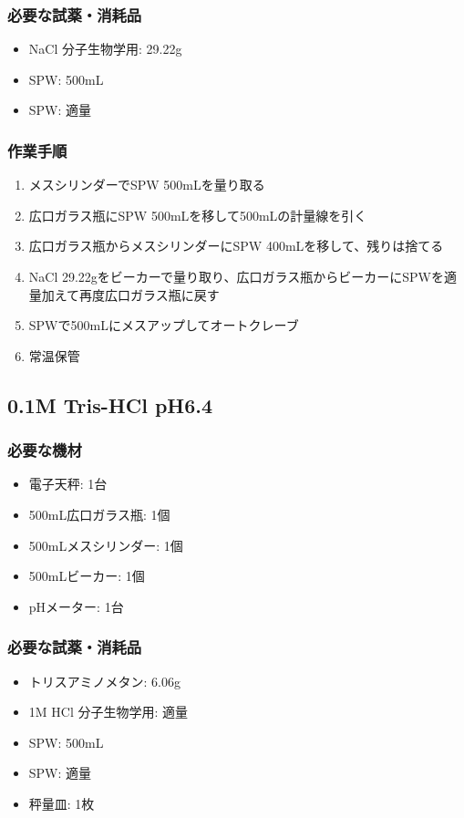 \documentclass[titlepage,10pt,a4paper]{jsbook}
\begin{document}
\subsubsection{必要な試薬・消耗品}
\begin{itemize}
\item NaCl 分子生物学用: 29.22g
\item SPW: 500mL
\item SPW: 適量
\end{itemize}

\subsubsection{作業手順}
\begin{enumerate}
\item メスシリンダーでSPW 500mLを量り取る
\item 広口ガラス瓶にSPW 500mLを移して500mLの計量線を引く
\item 広口ガラス瓶からメスシリンダーにSPW 400mLを移して、残りは捨てる
\item NaCl 29.22gをビーカーで量り取り、広口ガラス瓶からビーカーにSPWを適量加えて再度広口ガラス瓶に戻す
\item SPWで500mLにメスアップしてオートクレーブ
\item 常温保管
\end{enumerate}

\subsection{0.1M Tris-HCl pH6.4}

\subsubsection{必要な機材}
\begin{itemize}
\item 電子天秤: 1台
\item 500mL広口ガラス瓶: 1個
\item 500mLメスシリンダー: 1個
\item 500mLビーカー: 1個
\item pHメーター: 1台
\end{itemize}

\subsubsection{必要な試薬・消耗品}
\begin{itemize}
\item トリスアミノメタン: 6.06g
\item 1M HCl 分子生物学用: 適量
\item SPW: 500mL
\item SPW: 適量
\item 秤量皿: 1枚
\end{itemize}
\end{document}
